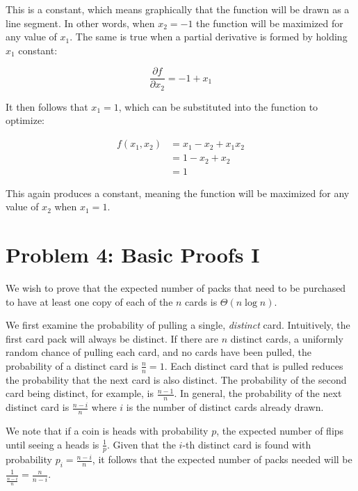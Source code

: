 \documentclass[12pt]{article}%
\begin{document}
\begin{enumerate}[label=(\alph*)]
This is a constant, which means graphically that the function will be drawn as a line segment. In other words, when $x_2 = -1$ the function will be maximized for any value of $x_1$. The same is true when a partial derivative is formed by holding $x_1$ constant:

\begin{equation}
\frac{\partial f}{\partial x_2} = -1 + x_1
\end{equation}

It then follows that $x_1 = 1$, which can be substituted into the function to optimize:

\begin{equation}
\begin{split}
f(x_1,x_2) &= x_1 - x_2 + x_{1}x_{2} \\
&= 1 - x_2 + x_2 \\
&= 1
\end{split}
\end{equation}

This again produces a constant, meaning the function will be maximized for any value of $x_2$ when $x_1 = 1$.

\end{enumerate}

\section*{Problem 4: Basic Proofs I}
We wish to prove that the expected number of packs that need to be purchased to have at least one copy of each of the $n$ cards is $\Theta(n \log n)$.

We first examine the probability of pulling a single, \emph{distinct} card. Intuitively, the first card pack will always be distinct. If there are $n$ distinct cards, a uniformly random chance of pulling each card, and no cards have been pulled, the probability of a distinct card is $\frac{n}{n} = 1$. Each distinct card that is pulled reduces the probability that the next card is also distinct. The probability of the second card being distinct, for example, is $\frac{n - 1}{n}$. In general, the probability of the next distinct card is $\frac{n - i}{n}$ where $i$ is the number of distinct cards already drawn.

We note that if a coin is heads with probability $p$, the expected number of flips until seeing a heads is $\frac{1}{p}$. Given that the $i$-th distinct card is found with probability $p_i = \frac{n - i}{n}$, it follows that the expected number of packs needed will be $\frac{1}{\frac{n - i}{n}} = \frac{n}{n - i}$.
\end{document}
